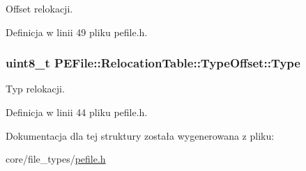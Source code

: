 Offset relokacji. 



Definicja w linii 49 pliku pefile.\-h.

\hypertarget{struct_p_e_file_1_1_relocation_table_1_1_type_offset_a1d812b2e05780019bb9bb44d6fb1a3db}{
\subsubsection[{Type}]{\setlength{\rightskip}{0pt plus 5cm}uint8\-\_\-t P\-E\-File\-::\-Relocation\-Table\-::\-Type\-Offset\-::\-Type}}\label{struct_p_e_file_1_1_relocation_table_1_1_type_offset_a1d812b2e05780019bb9bb44d6fb1a3db}


Typ relokacji. 



Definicja w linii 44 pliku pefile.\-h.



Dokumentacja dla tej struktury została wygenerowana z pliku\-:\begin{DoxyCompactItemize}
\item 
core/file\-\_\-types/\hyperlink{pefile_8h}{pefile.\-h}\end{DoxyCompactItemize}
